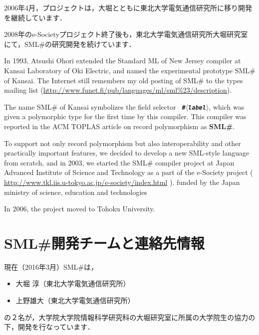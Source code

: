 \documentclass{jbook}
\newif\ifjp
\newcommand{\txt}[2]{#1}
\newcommand{\smlsharp}{SML\#}
\newcommand{\nonterm}[1]{\mbox{$\langle$}{\it #1}\mbox{$\rangle$}}
\begin{document}
2006年4月，プロジェクトは，大堀とともに東北大学電気通信研究所に移り開発
を継続しています．

2008年のe-Societyプロジェクト終了後も，東北大学電気通信研究所大堀研究室
にて，\smlsharp{}の研究開発を続けています．

\else%

	In 1993, Atsushi Ohori extended the Standard ML of New Jersey
compiler at Kansai Laboratory of Oki Electric, and named the
experimental prototype SML\# of Kansai.
	The Internet still remembers my old posting of \smlsharp{} to
the types mailing list 
(\url{http://www.funet.fi/pub/languages/ml/sml%23/description}).

	The name SML\# of Kansai symbolizes the field selector {\bf\tt
\#\nonterm{label}}, which was given a polymorphic type for the first
time by this compiler.
	This compiler was reported in the ACM TOPLAS article on record
polymorphism \cite{ohor95toplas} as {\bf \smlsharp{}}.

	To support not only record polymorphism but also
interoperability and other practically important features, we decided 
to develop a new SML-style language from scratch, and in 2003, we
started the \smlsharp{} compiler project at Japan Advanced Institute of 
Science and Technology as a part of the e-Society project 
(
\url{http://www.tkl.iis.u-tokyo.ac.jp/e-society/index.html}
).
funded by the Japan ministry of science, education and technologies

	In 2006, the project moved to Tohoku University.
\fi%

\section{
\txt{\smlsharp{}開発チームと連絡先情報}
{\smlsharp{} Development Team and Contact Information}
}
\label{sec:smlsharpTeam}

\ifjp%
	現在（2016年3月）\smlsharp{}は，
\begin{itemize}
\item 
大堀 淳（東北大学電気通信研究所）
\item 
上野雄大（東北大学電気通信研究所）
\end{itemize}
の２名が，大学院大学院情報科学研究科の大堀研究室に所属の大学院生の協力の
下，開発を行なっています．
\end{document}
